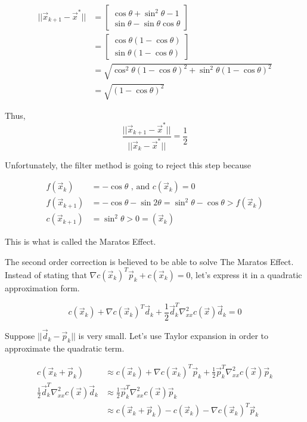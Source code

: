\documentclass[a4paper,10pt]{article}
\begin{document}
\begin{enumerate}
{        \begin{align}
            ||\vec{x}_{k+1}-\vec{x}^{*}|| &= \begin{bmatrix}
            \cos \theta+\sin ^{2} \theta-1 \\
            \sin \theta-\sin \theta \cos \theta
            \end{bmatrix} \\
            &= \begin{bmatrix}
            \cos \theta(1-\cos \theta) \\
            \sin \theta(1-\cos \theta)
            \end{bmatrix} \\
            &=\sqrt{\cos ^{2} \theta(1-\cos \theta)^{2}+\sin ^{2} \theta(1-\cos \theta)^{2}} \\
            &=\sqrt{(1-\cos \theta)^{2}}
        \end{align}

        Thus,
        \[
            \frac{||\vec{x}_{k+1} - \vec{x}^*||}{||\vec{x}_k - \vec{x}^*||} = \frac{1}{2}
        \]

        Unfortunately, the filter method is going to reject this step because 

        \begin{align}
            f(\vec{x}_k) &= - \cos \theta \text{ , and } c(\vec{x}_k) = 0 \\
            f(\vec{x}_{k+1}) &= - \cos \theta - \sin 2 \theta = \sin^2 \theta - \cos \theta > f(\vec{x}_k) \\
            c(\vec{x}_{k+1}) &= \sin^2 \theta > 0 = (\vec{x}_k)
        \end{align}

        This is what is called the Maratos Effect.

        The second order correction is believed to be able to solve The Maratos Effect. Instead of stating that $\nabla c\left(\vec{x}_{k}\right)^{T} \vec{p}_{k}+c\left(\vec{x}_{k}\right)=0$, let's express it in a quadratic approximation form.

        \[
            c \left(\vec{x}_{k}\right)+\nabla c\left(\vec{x}_{k}\right)^{T} \vec{d}_{k}+\frac{1}{2} \vec{d}_{k}^{T} \nabla_{x x}^{2} c(\vec{x}) \vec{d}_{k}=0
        \]

        Suppose $||\vec{d}_{k}-\vec{p}_{k}||$ is very small. Let's use Taylor expansion in order to approximate the quadratic term.

    
        \begin{align}
            c\left(\vec{x}_{k}+\vec{p}_{k}\right) &\approx c\left(\vec{x}_{k}\right)+\nabla c\left(\vec{x}_{k}\right)^{T} \vec{p}_{k}+\frac{1}{2} \vec{p}_{k}^{T} \nabla_{x x}^{2} c(\vec{x}) \vec{p}_{k} \\
            \frac{1}{2} \vec{d}_{k}^{T} \nabla_{x x}^{2} c(\vec{x}) \vec{d}_{k} &\approx \frac{1}{2} \vec{p}_{k}^{T} \nabla_{x x}^{2} c(\vec{x}) \vec{p}_{k} \\ 
            &\approx c\left(\vec{x}_{k}+\vec{p}_{k}\right)-c\left(\vec{x}_{k}\right)-\nabla c\left(\vec{x}_{k}\right)^{T} \vec{p}_{k}
        \end{align}

}
\end{enumerate}
\end{document}
